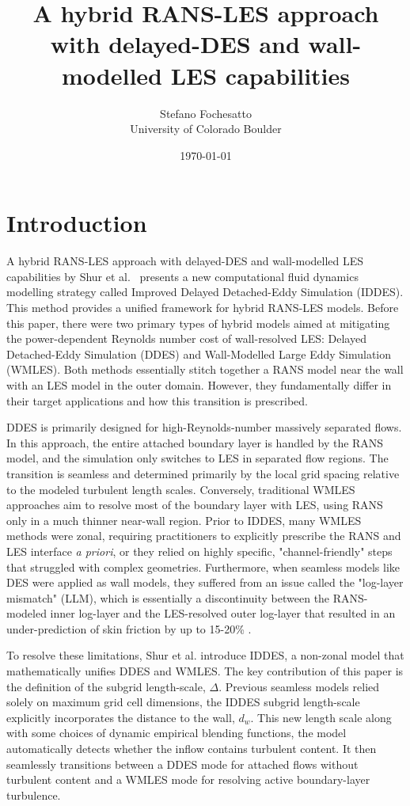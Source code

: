 \documentclass[12pt,letterpaper]{article}
\title{\Large \textbf{A hybrid RANS-LES approach with delayed-DES and wall-modelled LES capabilities}}
\author{Stefano Fochesatto \\ \small University of Colorado Boulder}
\date{\today}
\begin{document}
\maketitle



\section{Introduction} 
A hybrid RANS-LES approach with delayed-DES and wall-modelled LES capabilities by Shur et al.~\cite{shur2008hybrid} presents a new computational fluid dynamics modelling strategy called Improved Delayed Detached-Eddy Simulation (IDDES). This method provides a unified framework for hybrid RANS-LES models. Before this paper, there were two primary types of hybrid models aimed at mitigating the power-dependent Reynolds number cost of wall-resolved LES: Delayed Detached-Eddy Simulation (DDES) and Wall-Modelled Large Eddy Simulation (WMLES). Both methods essentially stitch together a RANS model near the wall with an LES model in the outer domain. However, they fundamentally differ in their target applications and how this transition is prescribed.

DDES is primarily designed for high-Reynolds-number massively separated flows. In this approach, the entire attached boundary layer is handled by the RANS model, and the simulation only switches to LES in separated flow regions. The transition is seamless and determined primarily by the local grid spacing relative to the modeled turbulent length scales. Conversely, traditional WMLES approaches aim to resolve most of the boundary layer with LES, using RANS only in a much thinner near-wall region. Prior to IDDES, many WMLES methods were zonal, requiring practitioners to explicitly prescribe the RANS and LES interface \emph{a priori}, or they relied on highly specific, "channel-friendly" steps that struggled with complex geometries. Furthermore, when seamless models like DES were applied as wall models, they suffered  from an issue called the "log-layer mismatch" (LLM), which is essentially a discontinuity between the RANS-modeled inner log-layer and the LES-resolved outer log-layer that resulted in an under-prediction of skin friction by up to 15-20\% \cite{shur2008hybrid}.

To resolve these limitations, Shur et al. introduce IDDES, a non-zonal model that mathematically unifies DDES and WMLES. The key contribution of this paper is the definition of the subgrid length-scale, $\Delta$. Previous seamless models relied solely on maximum grid cell dimensions, the IDDES subgrid length-scale explicitly incorporates the distance to the wall, $d_w$. This new length scale along with some choices of dynamic empirical blending functions, the model automatically detects whether the inflow contains turbulent content. It then seamlessly transitions between a DDES mode for attached flows without turbulent content and a WMLES mode for resolving active boundary-layer turbulence.
\end{document}
